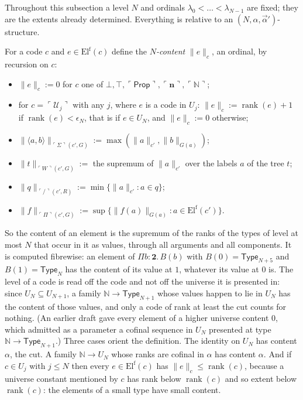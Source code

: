 \documentclass[10pt]{article}
\newcommand{\N}{\mathbb{N}}
\newcommand{\Prop}{\mathsf{Prop}}
\newcommand{\Type}{\mathsf{Type}}
\newcommand{\rk}{\operatorname{rank}}
\newcommand{\El}{\mathrm{El}}
\newcommand{\code}[1]{\ulcorner #1\urcorner}
\newcommand{\U}{\mathcal{U}}
\begin{document}
Throughout this subsection a level $N$ and ordinals
$\lambda_0<\dots<\lambda_{N-1}$ are fixed; they are the extents already
determined. Everything is relative to an
$(N,\alpha,\vec\alpha')$-structure.

\begin{definition}[content]\label{def:content}
For a code $c$ and $e\in\El^{\mathrm f}(c)$ define the \emph{$N$-content}
$\|e\|_c$, an ordinal, by recursion on $c$:
\begin{itemize}
\item $\|e\|_c:=0$ for $c$ one of $\bot,\top,\code\Prop,\code{\mathbf n},\code\N$;
\item for $c=\code{\U_j}$ with any $j$, where $e$ is a code in $U_j$:
  $\|e\|_c:=\rk(e)+1$ if $\rk(e)<\epsilon_N$, that is if $e\in U_N$, and
  $\|e\|_c:=0$ otherwise;
\item $\|\langle a,b\rangle\|_{\code\Sigma(c',G)}:=\max(\|a\|_{c'},\|b\|_{G(a)})$;
\item $\|t\|_{\code W(c',G)}:=$ the supremum of $\|a\|_{c'}$ over the labels
  $a$ of the tree $t$;
\item $\|q\|_{\code/(c',R)}:=\min\{\|a\|_{c'}:a\in q\}$;
\item $\|f\|_{\code\Pi(c',G)}:=\sup\{\|f(a)\|_{G(a)}:a\in\El^{\mathrm f}(c')\}$.
\end{itemize}
\end{definition}

So the content of an element is the supremum of the ranks of the types
of level at most $N$ that occur in it as values, through all arguments
and all components. It is computed fibrewise: an element of
$\Pi b{:}\mathbf 2.\,B(b)$ with $B(0)=\Type_{N+5}$ and $B(1)=\Type_N$ has
the content of its value at $1$, whatever its value at $0$ is. The level
of a code is read off the code and not off the universe it is presented
in: since $U_N\subseteq U_{N+1}$, a family $\N\to\Type_{N+1}$ whose values
happen to lie in $U_N$ has the content of those values, and only a code
of rank at least the cut counts for nothing. (An earlier draft gave
every element of a higher universe content $0$, which admitted as a
parameter a cofinal sequence in $U_N$ presented at type
$\N\to\Type_{N+1}$.) Three
cases orient the definition. The identity on $U_N$ has content $\alpha$,
the cut. A family $\N\to U_N$ whose ranks are cofinal in $\alpha$ has
content $\alpha$. And if $c\in U_j$ with $j\le N$ then every
$e\in\El^{\mathrm f}(c)$ has $\|e\|_c\le\rk(c)$, because a universe
constant mentioned by $c$ has rank below $\rk(c)$ and so extent below
$\rk(c)$: the elements of a small type have small content.
\end{document}
